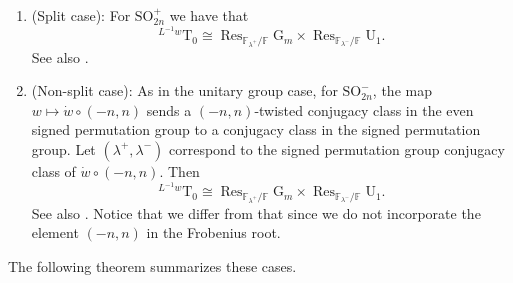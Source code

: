 \documentclass[12pt, reqno]{amsart}
\theoremstyle{definition}
\theoremstyle{definition}
\theoremstyle{definition}
\newcommand{\SO}{\mathrm{SO}}
\newcommand{\UnitaryGroup}{\mathrm{U}}
\newcommand{\finiteField}{\mathbb{F}}
\newcommand{\finiteFieldExtension}[1]{\finiteField_{#1}}
\newcommand{\restrictionOfScalars}[3]{\operatorname{Res}_{#1 \slash #2}{#3}}
\newcommand{\multiplcativeScheme}{\algebraicGroup{G}_m}
\newcommand{\algebraicGroup}[1]{\boldsymbol{\mathrm{#1}}}
\begin{document}
\begin{enumerate}
        \begin{enumerate}
        	\item (Split case): For $\algebraicGroup{\SO}_{2n}^+$ we have that
        	$$^{L^{-1}w}\algebraicGroup{T}_0 \cong \restrictionOfScalars{\finiteFieldExtension{\lambda^{+}}}{\finiteField}{\multiplcativeScheme} \times \restrictionOfScalars{\finiteFieldExtension{\lambda^{-}}}{\finiteField}{\algebraicGroup{\UnitaryGroup}_1}.$$
        	See also \cite[Section 3.2 Parts (C) and (D)]{Zalesski2018}.        	
        	\item (Non-split case): As in the unitary group case, for $\algebraicGroup{SO}_{2n}^-$, the map $w \mapsto \dot{w}\circ (-n,n)$ sends a $(-n,n)$-twisted conjugacy class in the even signed permutation group to a conjugacy class in the signed permutation group. Let $(\lambda^+,\lambda^-)$ correspond to the signed permutation group conjugacy class of $\dot{w} \circ (-n,n)$. Then
        	$$^{L^{-1}w}\algebraicGroup{T}_0 \cong \restrictionOfScalars{\finiteFieldExtension{\lambda^{+}}}{\finiteField}{\multiplcativeScheme} \times \restrictionOfScalars{\finiteFieldExtension{\lambda^{-}}}{\finiteField}{\algebraicGroup{\UnitaryGroup}_1}.$$
			See also \cite[Section 3.2 Part (D)]{Zalesski2018}. Notice that we differ from that \cite{Zalesski2018} since we do not incorporate the element $\left(-n, n\right)$ in the Frobenius root.
        \end{enumerate}
    \end{enumerate}
	The following theorem summarizes these cases.
	
\end{document}
